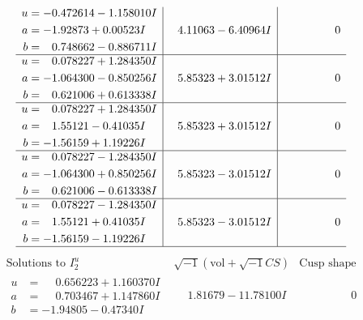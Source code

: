 \documentclass[1p]{elsarticle_modified}
\theoremstyle{definition}
\newcommand{\I}{\sqrt{-1}}
\begin{document}
$$\begin{array}{c|c|c}
\begin{aligned}
u &= -0.472614 - 1.158010 I \\
a &= -1.92873 + 0.00523 I \\
b &= \phantom{-}0.748662 - 0.886711 I\end{aligned}
 & \phantom{-}4.11063 - 6.40964 I & \phantom{-0.000000 } 0 \\ \hline\begin{aligned}
u &= \phantom{-}0.078227 + 1.284350 I \\
a &= -1.064300 - 0.850256 I \\
b &= \phantom{-}0.621006 + 0.613338 I\end{aligned}
 & \phantom{-}5.85323 + 3.01512 I & \phantom{-0.000000 } 0 \\ \hline\begin{aligned}
u &= \phantom{-}0.078227 + 1.284350 I \\
a &= \phantom{-}1.55121 - 0.41035 I \\
b &= -1.56159 + 1.19226 I\end{aligned}
 & \phantom{-}5.85323 + 3.01512 I & \phantom{-0.000000 } 0 \\ \hline\begin{aligned}
u &= \phantom{-}0.078227 - 1.284350 I \\
a &= -1.064300 + 0.850256 I \\
b &= \phantom{-}0.621006 - 0.613338 I\end{aligned}
 & \phantom{-}5.85323 - 3.01512 I & \phantom{-0.000000 } 0 \\ \hline\begin{aligned}
u &= \phantom{-}0.078227 - 1.284350 I \\
a &= \phantom{-}1.55121 + 0.41035 I \\
b &= -1.56159 - 1.19226 I\end{aligned}
 & \phantom{-}5.85323 - 3.01512 I & \phantom{-0.000000 } 0\\
 \hline 
 \end{array}$$\newpage$$\begin{array}{c|c|c}  
\text{Solutions to }I^u_{2}& \I (\text{vol} + \sqrt{-1}CS) & \text{Cusp shape}\\
 \hline 
\begin{aligned}
u &= \phantom{-}0.656223 + 1.160370 I \\
a &= \phantom{-}0.703467 + 1.147860 I \\
b &= -1.94805 - 0.47340 I\end{aligned}
 & \phantom{-}1.81679 - 11.78100 I & \phantom{-0.000000 } 0 \\ \hline\begin{aligned}

\end{aligned}
\end{array}$$
\end{document}
